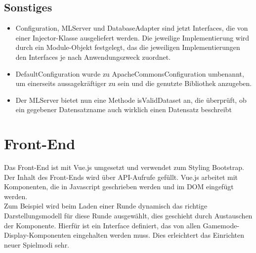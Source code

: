 \documentclass[a4paper]{scrreprt}
\begin{document}
\section{Sonstiges}
\begin{itemize}
    \item Configuration, MLServer und DatabaseAdapter sind jetzt Interfaces, die von einer Injector-Klasse ausgeliefert werden.
    Die jeweilige Implementierung wird durch ein Module-Objekt festgelegt, das die jeweiligen Implementierungen den Interfaces je nach Anwendungszweck zuordnet.
    \item DefaultConfiguration wurde zu ApacheCommonsConfiguration umbenannt, um einerseits aussagekräftiger zu sein und die genutzte Bibliothek anzugeben.
    \item Der MLServer bietet nun eine Methode isValidDataset an, die überprüft, ob ein gegebener Datensatzname auch wirklich einen Datensatz beschreibt
\end{itemize}

\chapter{Front-End}
Das Front-End ist mit Vue.js umgesetzt und verwendet zum Styling Bootstrap. Der Inhalt des Front-Ends wird über API-Aufrufe gefüllt.
Vue.js arbeitet mit Komponenten, die in Javascript geschrieben werden und im DOM eingefügt werden. \\
Zum Beispiel wird beim Laden einer Runde dynamisch das richtige Darstellungsmodell für diese Runde ausgewählt, dies geschieht durch Austauschen der Komponente. Hierfür ist ein Interface definiert, das von allen Gamemode-Display-Komponenten eingehalten werden muss. Dies erleichtert das Einrichten neuer Spielmodi sehr.
\end{document}
